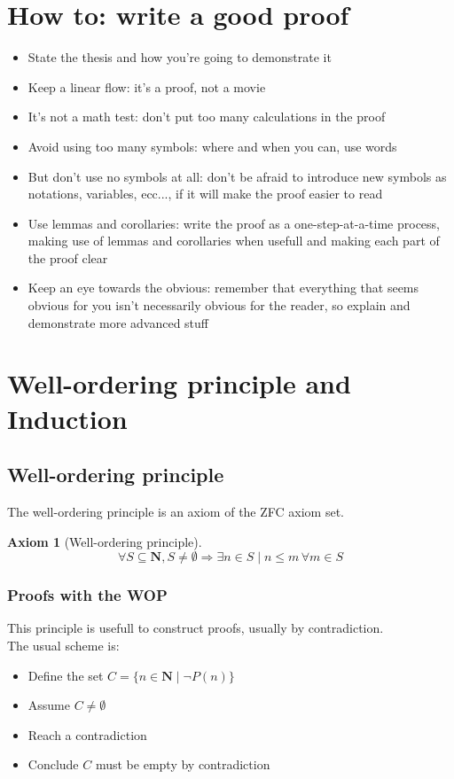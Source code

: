 \documentclass{report}
\newtheorem{axiom}{Axiom}[section]
\newcommand{\implies}{\Rightarrow}
\begin{document}
    \section{How to: write a good proof}
        \begin{itemize}
            \item State the thesis and how you're going to demonstrate it 
            \item Keep a linear flow: it's a proof, not a movie
            \item It's not a math test: don't put too many calculations in the proof 
            \item Avoid using too many symbols: where and when you can, use words
            \item But don't use no symbols at all: don't be afraid to introduce 
                new symbols as notations, variables, ecc..., if it will make the proof 
                easier to read
            \item Use lemmas and corollaries: write the proof as a one-step-at-a-time
                process, making use of lemmas and corollaries when usefull and making 
                each part of the proof clear
            \item Keep an eye towards the obvious: remember that everything that seems 
                obvious for you isn't necessarily obvious for the reader, so explain and demonstrate
                more advanced stuff 
        \end{itemize}
    \section{Well-ordering principle and Induction}
        \subsection{Well-ordering principle}
            The well-ordering principle is an axiom of the ZFC axiom set. \\
            \begin{axiom}[Well-ordering principle] 
                $$\forall S \subseteq \mathbf{N}, S \neq \emptyset \implies \exists n \in S 
                    \mid n \leq m \, \forall m \in S$$
            \end{axiom}
            \subsubsection{Proofs with the WOP}
                This principle is usefull to construct proofs, usually by contradiction. \\
                The usual scheme is:
                \begin{itemize}
                    \item Define the set $C = \{n \in \mathbf{N} \mid \neg P\left(n\right)\}$
                    \item Assume $C \neq \emptyset$ 
                    \item Reach a contradiction
                    \item Conclude $C$ must be empty by contradiction
                \end{itemize}
\end{document}
